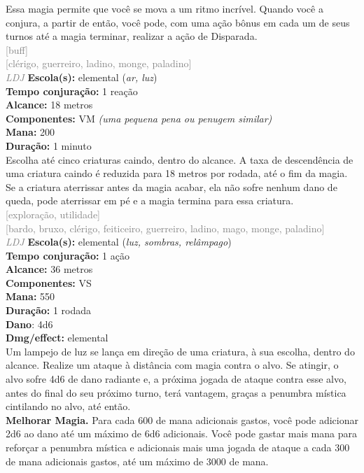 \documentclass{RPG_Adventure}[2021/10/20]
\begin{document}
{\normalsize Essa magia permite que você se mova a um ritmo incrível. Quando você a conjura, a partir de então, você pode, com uma ação bônus em cada um de seus turnos até a magia terminar, realizar a ação de Disparada.\\}
{\scriptsize \textcolor{gray}{[buff]\\}}
{\scriptsize \textcolor{gray}{[clérigo, guerreiro, ladino, monge, paladino]\\}}
{\tiny \textcolor{gray}{\textit{LDJ}}}
{\small \t \textbf{Escola(s):} elemental (\textit{ar, luz})\\\t \textbf{Tempo conjuração:} 1 reação\\\t \textbf{Alcance:} 18 metros\\\t \textbf{Componentes:} VM \textit{(uma pequena pena ou penugem similar)}\\\t \textbf{Mana:} 200\\\t \textbf{Duração:} 1 minuto\\}
{\normalsize Escolha até cinco criaturas caindo, dentro do alcance. A taxa de descendência de uma criatura caindo é reduzida para 18 metros por rodada, até o fim da magia. Se a criatura aterrissar antes da magia acabar, ela não sofre nenhum dano de queda, pode aterrissar em pé e a magia termina para essa criatura.\\}
{\scriptsize \textcolor{gray}{[exploração, utilidade]\\}}
{\scriptsize \textcolor{gray}{[bardo, bruxo, clérigo, feiticeiro, guerreiro, ladino, mago, monge, paladino]\\}}
{\tiny \textcolor{gray}{\textit{LDJ}}}
{\small \t \textbf{Escola(s):} elemental (\textit{luz, sombras, relâmpago})\\\t \textbf{Tempo conjuração:} 1 ação\\\t \textbf{Alcance:} 36 metros\\\t \textbf{Componentes:} VS\\\t \textbf{Mana:} 550\\\t \textbf{Duração:} 1 rodada\\\t \textbf{Dano}: 4d6\\\t \textbf{Dmg/effect:} elemental\\}
{\normalsize Um lampejo de luz se lança em direção de uma criatura, à sua escolha, dentro do alcance. Realize um ataque à distância com magia contra o alvo. Se atingir, o alvo sofre 4d6 de dano radiante e, a próxima jogada de ataque contra esse alvo, antes do final do seu próximo turno, terá vantagem, graças a penumbra mística cintilando no alvo, até então.\\\t \textbf{Melhorar Magia.} Para cada 600 de mana adicionais gastos, você pode adicionar 2d6 ao dano até um máximo de 6d6 adicionais. Você pode gastar mais mana para reforçar a penumbra mística e adicionais mais uma jogada de ataque a cada 300 de mana adicionais gastos, até um máximo de 3000 de mana.\\}
\end{document}
